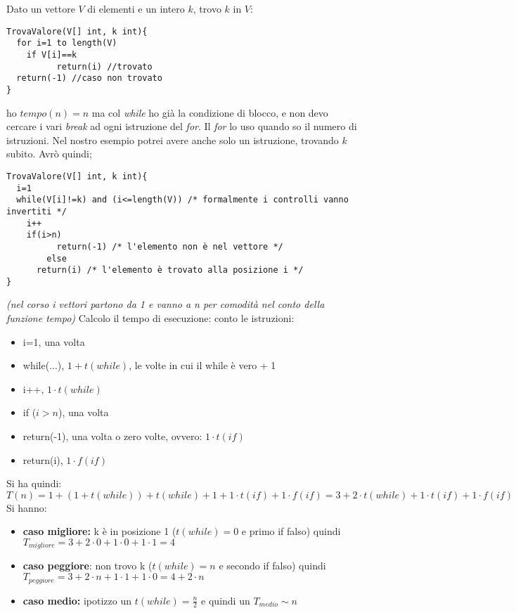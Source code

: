 \documentclass[a4paper,12pt,oneside,tikz]{book}
\begin{document}
\begin{esempio}
Dato un vettore $V$ di elementi e un intero $k$, trovo $k$ in $V$:
\begin{verbatim}
TrovaValore(V[] int, k int){
  for i=1 to length(V)
    if V[i]==k
    	  return(i) //trovato
  return(-1) //caso non trovato 
}
\end{verbatim}
ho $tempo(n)=n$
ma col \textit{while} ho già la condizione di blocco, e non devo cercare i vari \textit{break} ad ogni istruzione del \textit{for}. Il \textit{for} lo uso quando so il numero di istruzioni. Nel nostro esempio potrei avere anche solo un istruzione, trovando $k$ subito. Avrò quindi;
\begin{verbatim}
TrovaValore(V[] int, k int){
  i=1
  while(V[i]!=k) and (i<=length(V)) /* formalmente i controlli vanno invertiti */
    i++
    if(i>n)
    	  return(-1) /* l'elemento non è nel vettore */
    	else
      return(i) /* l'elemento è trovato alla posizione i */
}
\end{verbatim}
\textit{(nel corso i vettori partono da 1 e vanno a n per comodità nel conto della funzione tempo)}
Calcolo il tempo di esecuzione:
conto le istruzioni:
\begin{itemize}
\item i=1, una volta
\item while(...), $1 + t(while)$, le volte in cui il while è vero + 1
\item i++, $1\cdot t(while)$
\item if ($i>n$), una volta
\item return(-1), una volta o zero volte, ovvero: $1\cdot t(if)$
\item return(i), $1\cdot f(if)$
\end{itemize}
Si ha quindi:$$T(n)= 1 +(1+t(while)) + t(while) + 1 + 1\cdot t(if) + 1\cdot f(if)= 3+2\cdot t(while)+1\cdot t(if)+1\cdot f(if)$$
Si hanno:
\begin{itemize}
\item \textbf{caso migliore:} k è in posizione 1 ($t(while)=0$ e primo if falso) quindi $T_{migliore}=3+2\cdot 0 + 1\cdot 0 +1 \cdot 1=4$
\item \textbf{caso peggiore}: non trovo k ($t(while)=n$ e secondo if falso) quindi $T_{peggiore }=3+2\cdot n + 1\cdot 1 +1 \cdot 0=4+2\cdot n$
\item \textbf{caso medio:} ipotizzo un $t(while)=\frac{n}{2}$ e quindi un $T_{medio}\sim n$
\end{itemize}
\end{esempio}
\end{document}
